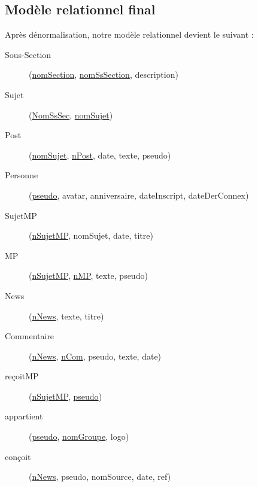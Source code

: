 \subsection{Modèle relationnel final}
Après dénormalisation, notre modèle relationnel devient le suivant :
\begin{description}
	\item[Sous-Section] (\underline{nomSection}, \underline{nomSsSection}, description)
	\item[Sujet] (\underline{NomSsSec}, \underline{nomSujet})
	\item[Post] (\underline{nomSujet}, \underline{n\degree Post}, date, texte, pseudo)
	\item[Personne] (\underline{pseudo}, avatar, anniversaire, dateInscript, dateDerConnex)
	\item[SujetMP] (\underline{n\degree SujetMP}, nomSujet, date, titre)
	\item[MP] (\underline{n\degree SujetMP}, \underline{n\degree MP}, texte, pseudo)
	\item[News] (\underline{n\degree News}, texte, titre)
	\item[Commentaire] (\underline{n\degree News}, \underline{n\degree Com}, pseudo, texte, date)
	\item[reçoitMP] (\underline{n\degree SujetMP}, \underline{pseudo})
	\item[appartient] (\underline{pseudo}, \underline{nomGroupe}, logo)
	\item[conçoit] (\underline{n\degree News}, pseudo, nomSource, date, ref)
\end{description}

